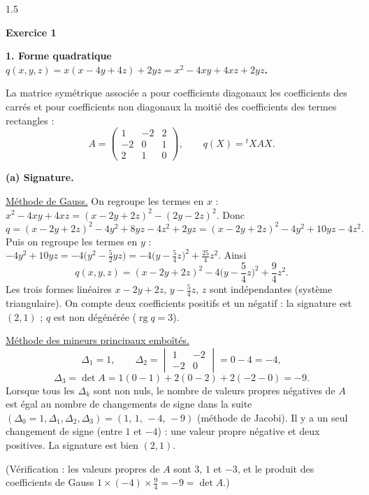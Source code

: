 \documentclass[12pt]{article}
\begin{document}
\begin{spacing}{1.5}

\textbf{Exercice 1}

\textbf{1. Forme quadratique $q(x,y,z)=x(x-4y+4z)+2yz=x^2-4xy+4xz+2yz$.}

La matrice symétrique associée a pour coefficients diagonaux les coefficients des carrés et pour coefficients non diagonaux la moitié des coefficients des termes rectangles :
\[
A=\begin{pmatrix}1&-2&2\\-2&0&1\\2&1&0\end{pmatrix},\qquad q(X)={}^tXAX .
\]

\textbf{(a) Signature.}

\underline{Méthode de Gauss.} On regroupe les termes en $x$ : $x^2-4xy+4xz=(x-2y+2z)^2-(2y-2z)^2$. Donc
\[
q=(x-2y+2z)^2-4y^2+8yz-4z^2+2yz=(x-2y+2z)^2-4y^2+10yz-4z^2 .
\]
Puis on regroupe les termes en $y$ : $-4y^2+10yz=-4\big(y^2-\frac52yz\big)=-4\big(y-\frac54z\big)^2+\frac{25}{4}z^2$. Ainsi
\[
\boxed{q(x,y,z)=(x-2y+2z)^2-4\Big(y-\frac54z\Big)^2+\frac94z^2}.
\]
Les trois formes linéaires $x-2y+2z$, $y-\frac54z$, $z$ sont indépendantes (système triangulaire). On compte deux coefficients positifs et un négatif : la signature est $\boxed{(2,1)}$ ; $q$ est non dégénérée ($\operatorname{rg}q=3$).

\underline{Méthode des mineurs principaux emboîtés.}
\[
\Delta_1=1,\qquad\Delta_2=\begin{vmatrix}1&-2\\-2&0\end{vmatrix}=0-4=-4,
\]
\[
\Delta_3=\det A=1(0-1)+2(0-2)+2(-2-0)=-9 .
\]
Lorsque tous les $\Delta_k$ sont non nuls, le nombre de valeurs propres négatives de $A$ est égal au nombre de changements de signe dans la suite $(\Delta_0=1,\Delta_1,\Delta_2,\Delta_3)=(1,\,1,\,-4,\,-9)$ (méthode de Jacobi). Il y a un seul changement de signe (entre $1$ et $-4$) : une valeur propre négative et deux positives. La signature est bien $(2,1)$.

(Vérification : les valeurs propres de $A$ sont $3$, $1$ et $-3$, et le produit des coefficients de Gauss $1\times(-4)\times\frac94=-9=\det A$.)


\end{spacing}
\end{document}
